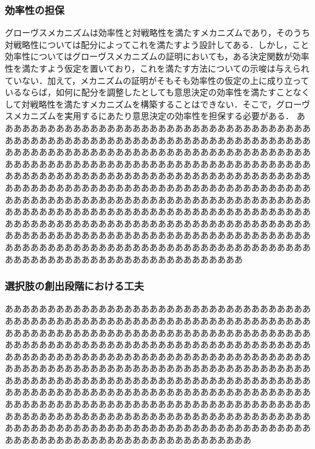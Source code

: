 \documentclass[a4paper, 11pt]{jsarticle}
\begin{document}
\subsubsection{効率性の担保}
グローヴスメカニズムは効率性と対戦略性を満たすメカニズムであり，そのうち対戦略性については配分によってこれを満たすよう設計してある．しかし，こと効率性についてはグローヴスメカニズムの証明においても，ある決定関数が効率性を満たすよう仮定を置いており，これを満たす方法についての示唆は与えられていない．加えて，メカニズムの証明がそもそも効率性の仮定の上に成り立っているならば，如何に配分を調整したとしても意思決定の効率性を満たすことなくして対戦略性を満たすメカニズムを構築することはできない．そこで，グローヴスメカニズムを実用するにあたり意思決定の効率性を担保する必要がある．
あああああああああああああああああああああああああああああああああああああああああああああああああああああああああああああああああああああああああああああああああああああああああああああああああああああああああああああああああああああああああああああああああああああああああああああああああああああああああああああああああああああああああああああああああああああああああああああああああああああああああああああああああああああああああああああああああああああああああああああああああああああああああああああああああああああああああああああああああああああああああああああああああああああああああああああああああああああああああああああああああああああああああああああああああああああああああああああああああああああああああああああああああああああああああああああああああああああああああああああああああああああああああああああああああああああああああ
\subsubsection{選択肢の創出段階における工夫}
あああああああああああああああああああああああああああああああああああああああああああああああああああああああああああああああああああああああああああああああああああああああああああああああああああああああああああああああああああああああああああああああああああああああああああああああああああああああああああああああああああああああああああああああああああああああああああああああああああああああああああああああああああああああああああああああああああああああああああああああああああああああああああああああああああああああああああああああああああああああああああああああああああああああああああああああああああああああああああああああああああああああああああああああああああああああああああああああああああああああああああああああああああああああああああああああああああああああああああああああああああああああああああああああああああああああああ
\end{document}
